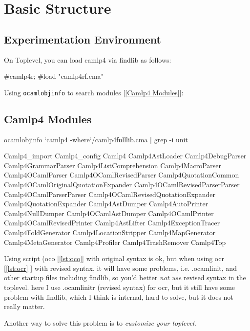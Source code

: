 \section{Basic Structure}

\subsection{Experimentation Environment}

On Toplevel, you can load camlp4 via findlib as follows:

\begin{ocamlcode}
#camlp4r;
#load "camlp4rf.cma"
\end{ocamlcode}
Using \verb|ocamlobjinfo| to search modules [\ref{Camlp4 Modules}]:     

\subsection{Camlp4 Modules}
\begin{bashcode}
ocamlobjinfo `camlp4 -where`/camlp4fulllib.cma | grep -i unit
\end{bashcode}

\begin{bluetext}
 Camlp4_import Camlp4_config Camlp4 Camlp4AstLoader Camlp4DebugParser
 Camlp4GrammarParser Camlp4ListComprehension Camlp4MacroParser
 Camlp4OCamlParser Camlp4OCamlRevisedParser Camlp4QuotationCommon
 Camlp4OCamlOriginalQuotationExpander Camlp4OCamlRevisedParserParser
 Camlp4OCamlParserParser Camlp4OCamlRevisedQuotationExpander
 Camlp4QuotationExpander Camlp4AstDumper Camlp4AutoPrinter
 Camlp4NullDumper Camlp4OCamlAstDumper Camlp4OCamlPrinter
 Camlp4OCamlRevisedPrinter Camlp4AstLifter Camlp4ExceptionTracer
 Camlp4FoldGenerator Camlp4LocationStripper Camlp4MapGenerator
 Camlp4MetaGenerator Camlp4Profiler Camlp4TrashRemover Camlp4Top
\end{bluetext}

Using script (oco [\ref{lst:oco}] with original syntax is ok, but when
using ocr [\ref{lst:ocr} ] with revised syntax, it will have some
problems, i.e. .ocamlinit, and other startup files including findlib,
so you'd better \textit{not use} revised syntax in the toplevel. here
I use .ocamlinitr (revised syntax) for ocr, but it still have some
problem with findlib, which I think is internal, hard to solve, but it
does not really matter.


Another way to solve this problem is to \textit{customize your toplevel}.

